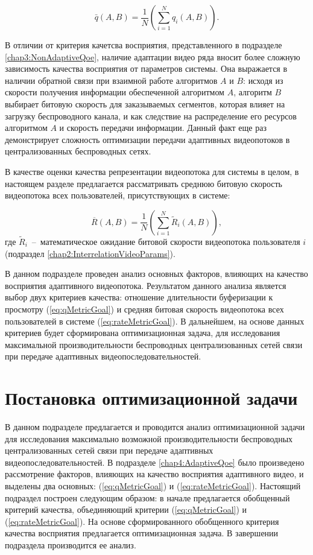 \begin{equation}
	\label{eq:qMetricGoal}
	\bar{q}\left(A, B\right)=\frac{1}{N}\left(\sum\limits_{i=1}^{N} {q_i\left(A,B\right)}\right).
\end{equation}

В отличии от критерия качетсва восприятия, представленного в подразделе \ref{chap3:NonAdaptiveQoe}, наличие адаптации видео ряда вносит более сложную зависимость качества восприятия от параметров системы. Она выражается в наличии обратной связи при взаимной работе алгоритмов $A$ и $B$: исходя из скорости получения информации обеспеченной алгоритмом $A$, алгоритм $B$ выбирает битовую скорость для заказываемых сегментов, которая влияет на загрузку беспроводного канала, и как следствие на распределение его ресурсов алгоритмом $A$ и скорость передачи информации. Данный факт еще раз демонстрирует сложность оптимизации передачи адаптивных видеопотоков в централизованных беспроводных сетях.

В качестве оценки качества репрезентации видеопотока для системы в целом, в настоящем разделе предлагается рассматривать среднюю битовую скорость видеопотока всех пользователей, присутствующих в системе:

\begin{equation}
	\label{eq:rateMetricGoal}
	\overline{R}\left(A,B\right) = \frac{1}{N}\left(\sum\limits_{i=1}^{N} {\tilde{R}_i\left(A,B\right)}\right),
\end{equation}
где $\tilde{R}_i$~--~математическое ожидание битовой скорости видеопотока пользователя $i$ (подраздел \ref{chap2:InterrelationVideoParams}).

В данном подразделе проведен анализ основных факторов, влияющих на качество восприятия адаптивного видеопотока. Результатом данного анализа является выбор двух критериев качества: отношение длительности буферизации к просмотру (\ref{eq:qMetricGoal}) и средняя битовая скорость видеопотока всех пользователей в системе (\ref{eq:rateMetricGoal}). В дальнейшем, на основе данных критериев будет сформирована оптимизационная задача, для исследования максимальной производительности беспроводных централизованных сетей связи при передаче адаптивных видеопоследовательностей.

\section{Постановка оптимизационной задачи}
\label{chap4:AdaptiveOptimizationProblem}

В данном подразделе предлагается и проводится анализ оптимизационной задачи для исследования максимально возможной производительности беспроводных централизованных сетей связи при передаче адаптивных видеопоследовательностей. В подразделе \ref{chap4:AdaptiveQoe} было произведено рассмотрение факторов, влияющих на качество восприятия адаптивного видео, и выделены два основных: (\ref{eq:qMetricGoal}) и (\ref{eq:rateMetricGoal}). Настоящий подраздел построен следующим образом: в начале предлагается обобщенный критерий качества, объединяющий критерии (\ref{eq:qMetricGoal}) и (\ref{eq:rateMetricGoal}). На основе сформированного обобщенного критерия качества восприятия предлагается оптимизационная задача. В завершении подраздела производится ее анализ.

